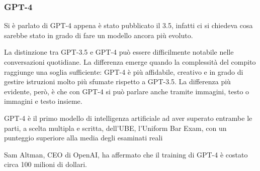 \subsubsection{GPT-4}
Si è parlato di GPT-4 appena è stato pubblicato il 3.5, infatti ci si chiedeva cosa sarebbe stato in grado di fare un modello ancora più evoluto.

La distinzione tra GPT-3.5 e GPT-4 può essere difficilmente notabile nelle conversazioni quotidiane. La differenza emerge quando la complessità del compito raggiunge una soglia sufficiente: GPT-4 è più affidabile, creativo e in grado di gestire istruzioni molto più sfumate rispetto a GPT-3.5. 
La differenza più evidente, però, è che con GPT-4 si può parlare anche tramite immagini, testo o immagini e testo insieme.

GPT-4 è il primo modello di intelligenza artificiale ad aver superato entrambe le parti, a scelta multipla e scritta, dell'UBE, l'Uniform Bar Exam, con un punteggio superiore alla media degli esaminati reali \cite{gpt4bar}

Sam Altman, CEO di OpenAI, ha affermato che il training di GPT-4 è costato circa 100 milioni di dollari.